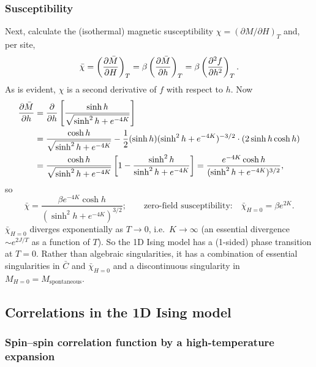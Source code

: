 \subsubsection*{Susceptibility}

Next, calculate the (isothermal) magnetic susceptibility $\chi = (\partial M/\partial H)_T$
and, per site,
\begin{equation}
  \bar\chi = \left(\frac{\partial \bar M}{\partial H}\right)_T = \beta\left(\frac{\partial \bar M}{\partial h}\right)_T
  = \beta\left(\frac{\partial^2 f}{\partial h^2}\right)_T .
\end{equation}
As is evident, $\chi$ is a second derivative of $f$ with respect to $h$. Now
\begin{align}
  \frac{\partial \bar M}{\partial h} &= \frac{\partial }{\partial h}\left[\frac{\sinh h}{\sqrt{\sinh^2h+e^{-4K}}}\right]\nonumber\\
  &= \frac{\cosh h}{\sqrt{\sinh^2h+e^{-4K}}}
    - \frac{1}{2}(\sinh h)(\sinh^2h+e^{-4K})^{-3/2}\cdot(2\sinh h\cosh h)\nonumber\\
  &= \frac{\cosh h}{\sqrt{\sinh^2h+e^{-4K}}}\left[1-\frac{\sinh^2h}{\sinh^2h+e^{-4K}}\right]
   = \frac{e^{-4K}\cosh h}{(\sinh^2h+e^{-4K})^{3/2}},
\end{align}
so
\begin{equation}
  \bar\chi = \frac{\beta e^{-4K}\cosh h}{(\sinh^2h+e^{-4K})^{3/2}};
  \qquad\text{zero-field susceptibility:}\quad \bar\chi_{H=0} = \beta e^{2K}.
\end{equation}
$\bar\chi_{H=0}$ diverges exponentially as $T\to 0$, i.e.\ $K\to\infty$ (an essential divergence
$\sim e^{2J/T}$ as a function of $T$). So the 1D Ising model has a (1-sided) phase transition at
$T = 0$. Rather than algebraic singularities, it has a combination of essential singularities in
$\bar C$ and $\bar\chi_{H=0}$ and a discontinuous singularity in
$M_{H=0} = M_{\text{spontaneous}}$.

\subsection{Correlations in the 1D Ising model}
\subsubsection*{Spin--spin correlation function by a high-temperature expansion}


